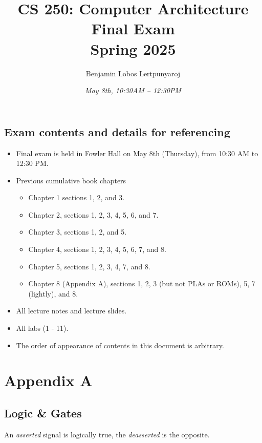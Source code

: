 \documentclass[11pt]{article}
\title{\textbf{CS 250: Computer Architecture\\Final Exam\\Spring 2025}}
\author{Benjamin Lobos Lertpunyaroj}
\date{\textit{May 8th, 10:30{\tiny AM} – 12:30{\tiny PM}}}
\begin{document}
\maketitle

\vspace{1em}

\begin{center}
\section*{Exam contents and details for referencing}
\end{center}

\begin{itemize}[itemsep=-0.5em, left=0pt, label={•}]
    \item Final exam is held in Fowler Hall on May 8th (Thursday), from 10:30 {\tiny AM} to 12:30 {\tiny PM}.
    \item Previous cumulative book chapters
    \vspace{-0.8em}
    \begin{itemize}[itemsep=-0.5em, left=0pt, label={•}]
    \item Chapter 1 sections 1, 2, and 3.
    \item Chapter 2, sections 1, 2, 3, 4, 5, 6, and 7.
    \item Chapter 3, sections 1, 2, and 5.
    \item Chapter 4, sections 1, 2, 3, 4, 5, 6, 7, and 8.
    \item Chapter 5, sections 1, 2, 3, 4, 7, and 8.
    \item Chapter 8 (Appendix A), sections 1, 2, 3 (but not PLAs or ROMs), 5, 7 (lightly), and 8.
    \end{itemize}
    \item All lecture notes and lecture slides.
    \item All labs (1 - 11).
    \item The order of appearance of contents in this document is arbitrary.
\end{itemize}

\pagebreak

\section*{Appendix A}

\subsection*{Logic \& Gates}
An \textit{asserted} signal is logically true, the \textit{deasserted} is the opposite.
\end{document}
